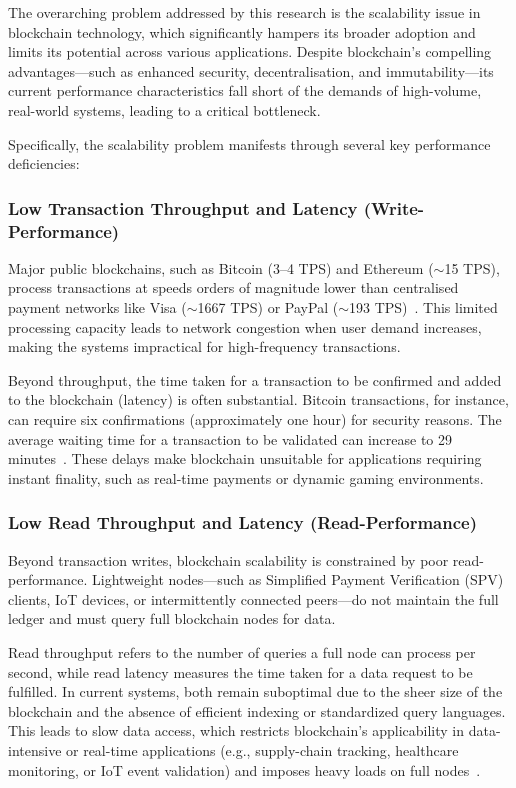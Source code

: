 The overarching problem addressed by this research is the scalability issue in blockchain technology, which significantly hampers its broader adoption and limits its potential across various applications. Despite blockchain's compelling advantages—such as enhanced security, decentralisation, and immutability—its current performance characteristics fall short of the demands of high-volume, real-world systems, leading to a critical bottleneck.

Specifically, the scalability problem manifests through several key performance deficiencies:

\subsubsection*{Low Transaction Throughput and Latency (Write-Performance)}
Major public blockchains, such as Bitcoin (3--4 TPS) and Ethereum ($\sim$15 TPS), process transactions at speeds orders of magnitude lower than centralised payment networks like Visa ($\sim$1667 TPS) or PayPal ($\sim$193 TPS)~\cite{x}. This limited processing capacity leads to network congestion when user demand increases, making the systems impractical for high-frequency transactions.

Beyond throughput, the time taken for a transaction to be confirmed and added to the blockchain (latency) is often substantial. Bitcoin transactions, for instance, can require six confirmations (approximately one hour) for security reasons. The average waiting time for a transaction to be validated can increase to 29 minutes~\cite{ref5}. These delays make blockchain unsuitable for applications requiring instant finality, such as real-time payments or dynamic gaming environments.

\subsubsection*{Low Read Throughput and Latency (Read-Performance)}
Beyond transaction writes, blockchain scalability is constrained by poor read-performance. Lightweight nodes---such as Simplified Payment Verification (SPV) clients, IoT devices, or intermittently connected peers---do not maintain the full ledger and must query full blockchain nodes for data.

Read throughput refers to the number of queries a full node can process per second, while read latency measures the time taken for a data request to be fulfilled. In current systems, both remain suboptimal due to the sheer size of the blockchain and the absence of efficient indexing or standardized query languages. This leads to slow data access, which restricts blockchain’s applicability in data-intensive or real-time applications (e.g., supply-chain tracking, healthcare monitoring, or IoT event validation) and imposes heavy loads on full nodes~\cite{sanka2021systematic}.

